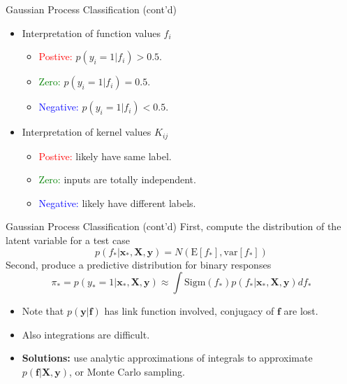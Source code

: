 \documentclass[10pt,mathserif]{beamer}
\begin{document}
\begin{frame}{Gaussian Process Classification (cont'd)}
\begin{itemize}
    \item Interpretation of function values $f_i$
    \begin{itemize}
        \item \textcolor{red}{Postive:} $p(y_i = 1 |f_i) > 0.5$.
        \item \textcolor{green}{Zero:} $p(y_i = 1 |f_i) = 0.5$.
        \item \textcolor{blue}{Negative:} $p(y_i = 1 |f_i) < 0.5$.
    \end{itemize}
    \item Interpretation of kernel values $K_{ij}$
    \begin{itemize}
        \item \textcolor{red}{Postive:} likely have same label.
        \item \textcolor{green}{Zero:} inputs are totally independent.
        \item \textcolor{blue}{Negative:} likely have different labels.
    \end{itemize}
\end{itemize}    
\end{frame}

\begin{frame}{Gaussian Process Classification (cont'd)}
First, compute the distribution of the latent variable for a test case
\begin{equation*}
    p(f_*|\bm{x}_*, \bm{X}, \bm{y}) = N (\text{E}[f_*] , \text{var}[f_*]) 
\end{equation*}
Second, produce a predictive distribution for binary responses
\begin{equation*}
    \pi_* = p(y_* = 1|\bm{x}_*, \bm{X}, \bm{y}) \approx \int \text{Sigm}(f_*)p(f_*|\bm{x}_*, \bm{X}, \bm{y})df_*
\end{equation*}
\begin{itemize}
    \item Note that $p(\bm{y}|\bm{f})$ has link function involved, conjugacy of $\bm{f}$ are lost.
    \item Also integrations are difficult.
    \item \textbf{Solutions:} use analytic approximations of integrals to approximate $p(\bm{f}|\bm{X}, \bm{y})$, or Monte Carlo sampling.
\end{itemize}    
\end{frame}
\end{document}
